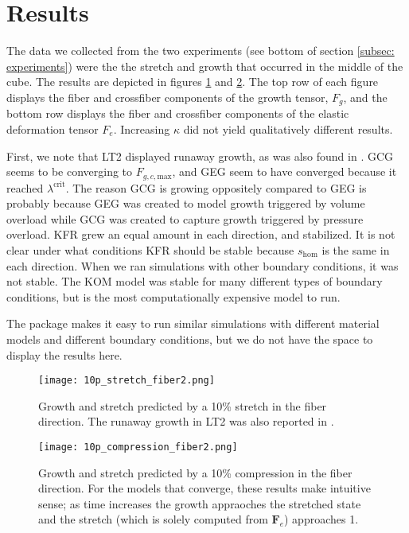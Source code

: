\section{Results}
The data we collected from the two experiments (see bottom of section \ref{subsec: experiments}) were the the stretch and growth that occurred in the middle of the cube. The results are depicted in figures \ref{fig:10p_stretch} and \ref{fig:10p_compression}. The top row of each figure displays the fiber and crossfiber components of the growth tensor, $F_g$, and the bottom row displays the fiber and crossfiber components of the elastic deformation tensor $F_e$. Increasing $\kappa$ did not yield qualitatively different results. \par
First, we note that LT2 displayed runaway growth, as was also found in \cite{Witzenburg2018}. GCG seems to be converging to $F_{g,c,\mathrm{max}}$, and GEG seem to have converged because it reached $\lambda^\text{crit}$. The reason GCG is growing oppositely compared to GEG is probably because GEG was created to model growth triggered by volume overload while GCG was created to capture growth triggered by pressure overload. KFR grew an equal amount in each direction, and stabilized. It is not clear under what conditions KFR should be stable because $s_\mathrm{hom}$ is the same in each direction. When we ran simulations with other boundary conditions, it was not stable. The KOM model was stable for many different types of boundary conditions, but is the most computationally expensive model to run.\par 
The package makes it easy to run similar simulations with different material models and different boundary conditions, but we do not have the space to display the results here. \par
\begin{figure}[h]
    \centering
    \texttt{[image: 10p\_stretch\_fiber2.png]}
    \caption{Growth and stretch predicted by a 10\% stretch in the fiber direction. The runaway growth in LT2 was also reported in \cite{Taber1998}.}
    \label{fig:10p_stretch}
\end{figure}
\begin{figure}[h]
    \centering
    \texttt{[image: 10p\_compression\_fiber2.png]}
    \caption{Growth and stretch predicted by a 10\% compression in the fiber direction. For the models that converge, these results make intuitive sense; as time increases the growth appraoches the stretched state and the stretch (which is solely computed from $\mathbf{F}_e$) approaches 1.}
    \label{fig:10p_compression}
\end{figure}    
